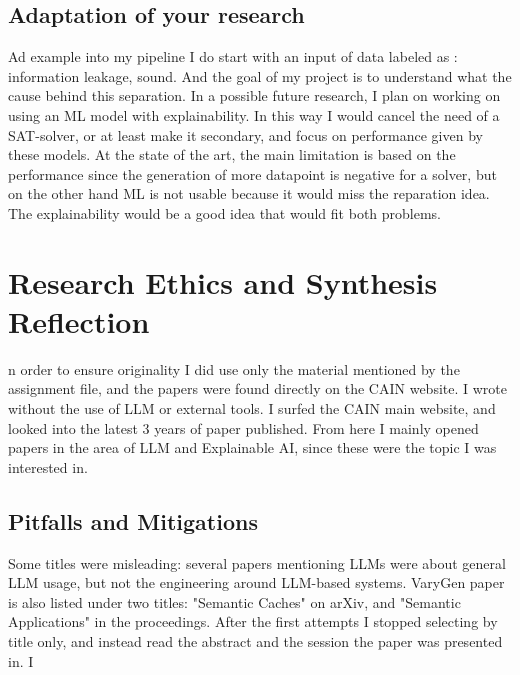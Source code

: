 \documentclass[11pt]{article}
\begin{document}
\subsection{Adaptation of your research}
Ad example into my pipeline I do start with an input of data labeled as : information leakage, sound. 
And the goal of my project is to understand what the cause behind this separation.
In a possible future research, I plan on working on using an ML model with explainability. 
In this way I would cancel the need of a SAT-solver, or at least make it secondary, and focus on performance given by these models. 
At the state of the art, the main limitation is based on the performance since the generation of more datapoint is negative for a solver, but on the other hand ML is not usable because it would miss the reparation idea. 
The explainability would be a good idea that would fit both problems. 

\section{Research Ethics and Synthesis Reflection}
n order to ensure originality I did use only the material mentioned by the assignment file, and the papers were found directly on the CAIN website. 
I wrote without the use of LLM or external tools.
I surfed the CAIN main website, and looked into the latest 3 years of paper published. 
From here I mainly opened papers in the area of LLM and Explainable AI, since these were the topic I was interested in. 
\subsection{Pitfalls and Mitigations}Some titles were misleading: several papers mentioning LLMs were about general LLM usage, but not the engineering around LLM-based systems. VaryGen paper is also listed under two titles: "Semantic Caches" on arXiv, and "Semantic Applications" in the proceedings. After the first attempts I stopped selecting by title only, and instead read the abstract and the session the paper was presented in.
I
\end{document}
